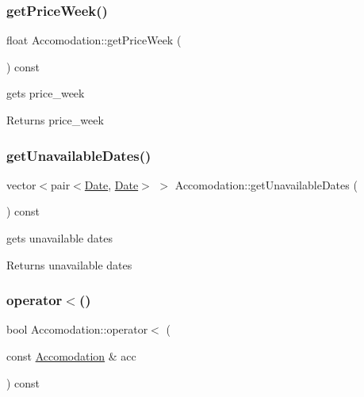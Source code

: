 \subsubsection{\texorpdfstring{get\+Price\+Week()}{getPriceWeek()}}
{\footnotesize\ttfamily float Accomodation\+::get\+Price\+Week (\begin{DoxyParamCaption}{ }\end{DoxyParamCaption}) const\hspace{0.3cm}{\ttfamily [inline]}}



gets price\+\_\+week 

\begin{DoxyReturn}{Returns}
price\+\_\+week 
\end{DoxyReturn}
\hypertarget{class_accomodation_a63c58fd6e01101095522573579490e7b}{}\label{class_accomodation_a63c58fd6e01101095522573579490e7b} 
\subsubsection{\texorpdfstring{get\+Unavailable\+Dates()}{getUnavailableDates()}}
{\footnotesize\ttfamily vector$<$pair$<$\hyperlink{class_date}{Date}, \hyperlink{class_date}{Date}$>$ $>$ Accomodation\+::get\+Unavailable\+Dates (\begin{DoxyParamCaption}{ }\end{DoxyParamCaption}) const\hspace{0.3cm}{\ttfamily [inline]}}



gets unavailable dates 

\begin{DoxyReturn}{Returns}
unavailable dates 
\end{DoxyReturn}
\hypertarget{class_accomodation_a7b5ccdc621aaf7c3dbe21800da6988c2}{}\label{class_accomodation_a7b5ccdc621aaf7c3dbe21800da6988c2} 
\subsubsection{\texorpdfstring{operator$<$()}{operator<()}}
{\footnotesize\ttfamily bool Accomodation\+::operator$<$ (\begin{DoxyParamCaption}\item[{const \hyperlink{class_accomodation}{Accomodation} \&}]{acc }\end{DoxyParamCaption}) const}



